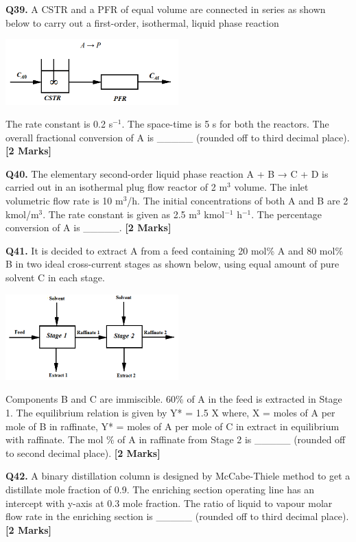 \documentclass[11pt]{article}
\newcommand{\questionb}[2]{
    \noindent\textbf{Q#2.} #1 \hfill \textbf{[2 Marks]}
}
\begin{document}
\questionb{A CSTR and a PFR of equal volume are connected in series as shown below to carry out a first-order, isothermal, liquid phase reaction 
\begin{center}
\includegraphics[width=0.5\textwidth]{figures/Q39.png}
\end{center}
The rate constant is 0.2 s\(^{-1}\). The space-time is 5 s for both the reactors. The overall fractional conversion of A is \_\_\_\_\_ (rounded off to third decimal place).}{39}
\vspace{0.5cm}

\questionb{The elementary second-order liquid phase reaction A + B → C + D is carried out in an isothermal plug flow reactor of 2 m\(^3\) volume. The inlet volumetric flow rate is 10 m\(^3\)/h. The initial concentrations of both A and B are 2 kmol/m\(^3\). The rate constant is given as 2.5 m\(^3\) kmol\(^{-1}\) h\(^{-1}\). The percentage conversion of A is \_\_\_\_\_.}{40}
\vspace{0.5cm}
\questionb{It is decided to extract A from a feed containing 20 mol\% A and 80 mol\% B in two ideal cross-current stages as shown below, using equal amount of pure solvent C in each stage. 
\begin{center}
\includegraphics[width=0.5\textwidth]{figures/Q41.png}
\end{center}
Components B and C are immiscible. 60\% of A in the feed is extracted in Stage 1. The equilibrium relation is given by Y* = 1.5 X where, X = moles of A per mole of B in raffinate, Y* = moles of A per mole of C in extract in equilibrium with raffinate. The mol \% of A in raffinate from Stage 2 is \_\_\_\_\_ (rounded off to second decimal place).}{41}
\vspace{0.5 cm}

\questionb{A binary distillation column is designed by McCabe-Thiele method to get a distillate mole fraction of 0.9. The enriching section operating line has an intercept with y-axis at 0.3 mole fraction. The ratio of liquid to vapour molar flow rate in the enriching section is \_\_\_\_\_ (rounded off to third decimal place).}{42}
\vspace{0.5 cm}
\end{document}
